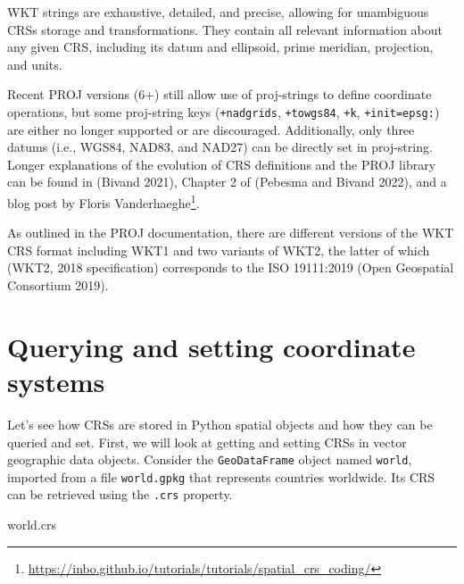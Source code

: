 \documentclass[
  letterpaper,
]{krantz}
\newenvironment{Shaded}{\begin{snugshade}}{\end{snugshade}}
\newcommand{\NormalTok}[1]{\textcolor[rgb]{0.00,0.23,0.31}{#1}}
\begin{document}
WKT strings are exhaustive, detailed, and precise, allowing for
unambiguous CRSs storage and transformations. They contain all relevant
information about any given CRS, including its datum and ellipsoid,
prime meridian, projection, and units.

Recent PROJ versions (6+) still allow use of proj-strings to define
coordinate operations, but some proj-string keys (\texttt{+nadgrids},
\texttt{+towgs84}, \texttt{+k}, \texttt{+init=epsg:}) are either no
longer supported or are discouraged. Additionally, only three datums
(i.e., WGS84, NAD83, and NAD27) can be directly set in proj-string.
Longer explanations of the evolution of CRS definitions and the PROJ
library can be found in (Bivand 2021), Chapter 2 of (Pebesma and Bivand
2022), and a blog post by Floris Vanderhaeghe\footnote{\url{https://inbo.github.io/tutorials/tutorials/spatial_crs_coding/}}.

\begin{tcolorbox}[enhanced jigsaw, coltitle=black, colback=white, opacitybacktitle=0.6, rightrule=.15mm, titlerule=0mm, colbacktitle=quarto-callout-note-color!10!white, colframe=quarto-callout-note-color-frame, title=\textcolor{quarto-callout-note-color}{\faInfo}\hspace{0.5em}{Note}, left=2mm, breakable, arc=.35mm, bottomtitle=1mm, toptitle=1mm, bottomrule=.15mm, opacityback=0, leftrule=.75mm, toprule=.15mm]

As outlined in the PROJ documentation, there are different versions of
the WKT CRS format including WKT1 and two variants of WKT2, the latter
of which (WKT2, 2018 specification) corresponds to the ISO 19111:2019
(Open Geospatial Consortium 2019).

\end{tcolorbox}

\section{Querying and setting coordinate
systems}\label{sec-querying-and-setting-coordinate-systems}

Let's see how CRSs are stored in Python spatial objects and how they can
be queried and set. First, we will look at getting and setting CRSs in
vector geographic data objects. Consider the \texttt{GeoDataFrame}
object named \texttt{world}, imported from a file \texttt{world.gpkg}
that represents countries worldwide. Its CRS can be retrieved using the
\texttt{.crs} property.

\begin{Shaded}
\begin{Highlighting}[]
\NormalTok{world.crs}
\end{Highlighting}
\end{Shaded}
\end{document}
